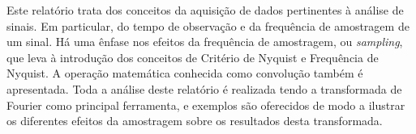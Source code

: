 
\begin{resumo}


\hypertarget{estilo:resumo}{} %

Este relatório trata dos conceitos da aquisição de dados pertinentes à análise de sinais. Em particular, do tempo de observação e da frequência de amostragem de um sinal. Há uma ênfase nos efeitos da frequência de amostragem, ou \textit{sampling}, que leva à introdução dos conceitos de Critério de Nyquist e Frequência de Nyquist. A operação matemática conhecida como convolução também é apresentada. Toda a análise deste relatório é realizada tendo a transformada de Fourier como principal ferramenta, e exemplos são oferecidos de modo a ilustrar os diferentes efeitos da amostragem sobre os resultados desta transformada.

 
\end{resumo}